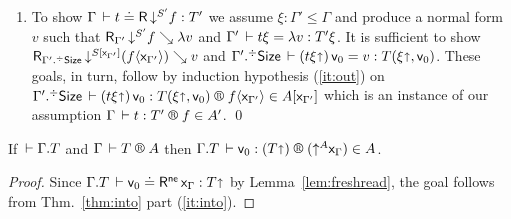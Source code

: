 \documentclass[acmsmall,screen]{acmart}\settopmatter{}
\makeatletter
\newcommand{\LONGVERSION}[1]{}
\newenvironment{proof*}[1][\proofname]{\par
  \normalfont \topsep6\p@\@plus6\p@\relax
  \trivlist
  \item[\@proofindent\hskip\labelsep
        {\@proofnamefont #1\@addpunct{.}}]\ignorespaces
}{%
  \endtrivlist\@endpefalse
}
\makeatother
\begin{document}
{\begin{proof*}
\begin{caselist}
\begin{enumerate}
\item %
To show $\Gamma \,\vdash t \doteq \mathsf{R}\, \mathord{\downarrow^{S'}} f : T'$ we assume $\xi : \Gamma' \leq \Gamma$ and
produce a normal form $v$ such that $\mathsf{R}_{\Gamma'} \, \mathord{\downarrow^{S'}}f \searrow \lambda v$ and
$\Gamma' \,\vdash t\xi = \lambda v : T'\xi$.
It is sufficient to show
$\mathsf{R}_{\Gamma'.{}^{\mathord{\div}}\mathsf{Size}} \, \mathord{\downarrow^{S[\mathsf{x}_{\Gamma'}]}}(f \langle\mathsf{x}_{\Gamma'}\rangle) \searrow v$
and
$\Gamma'.{}^{\mathord{\div}}\mathsf{Size} \,\vdash (t\xi\mathord{\shortuparrow})\,\mathsf{v}_{0} = v : T(\xi\mathord{\shortuparrow},\mathsf{v}_{0})$.
These goals, in turn, follow by induction hypothesis (\ref{it:out}) on
$\LR{\erext{\Gamma'}\Size}{(t\xi\slift)\,\ind 0}{T(\xi\slift,\ind 0)}{f \ann{\var{\Gamma'}}}{A[\var{\Gamma'}]}$ which is an instance of our assumption
$\LR \Gamma t {T'} f {A'}$.
\qed
\end{enumerate}
%
\end{caselist}
\end{proof*}
\begin{corollary}
  \label{cor:fresh}
  If\/ $\,\vdash \Gamma. T$ and %
  $\RG \Gamma T A$
  then $\LR {\cext \Gamma T} {\ind 0} {(T \slift)} {(\up A \var\Gamma)} A$.
\end{corollary}
\begin{proof}
  Since $\Gamma. T \,\vdash \mathsf{v}_{0} \doteq \mathsf{R}^{\mathsf{ne}}\, \mathsf{x}_{\Gamma} : T \mathord{\shortuparrow}$
  by Lemma~\ref{lem:freshread},
  the goal follows from Thm.~\ref{thm:into} part (\ref{it:into}).
\end{proof}
} %


\LONGVERSION{
\begin{corollary}[One-to-one]
\label{cor:oneone}
\bla
\begin{enumerate}
\item
If\/ $\LRSize \Gamma a \alpha$ and $\LRSize \Gamma {a'} \alpha$ then $a = a'$.
\item
If\/ $\LRT \Gamma T A \ell$ and $\LRT \Gamma {T'} A {\ell'}$ then $\Gamma \der T = T'$.
\end{enumerate}
\end{corollary}
} %
\end{document}
